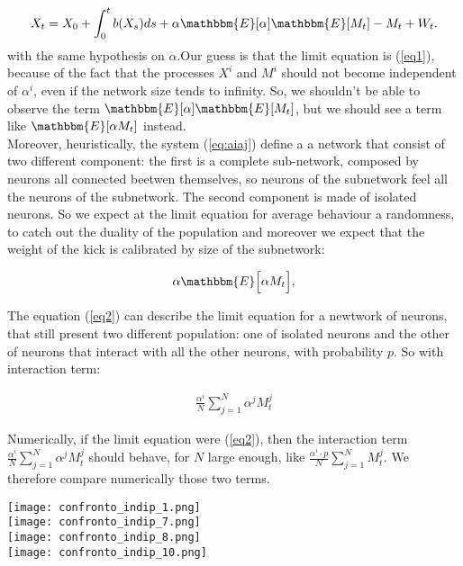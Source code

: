 \documentclass[11pt, a4paper]{article}
\begin{document}
\begin{equation} \label{eq2} X_t = X_0 + \int_0^t b(X_s) ds + \alpha \mathbbm{E}[\alpha] \mathbbm{E}[M_t] - M_t + W_t. 
\end{equation}
with the same hypothesis on $\alpha$.Our guess is that the limit equation is (\ref{eq1}), because of the fact that the processes $X^i$ and $M^i$ should not become independent of $\alpha^i$, even if the network size tends to infinity. So, we shouldn't be able to observe the term $\mathbbm{E}[\alpha]\mathbbm{E}[M_t]$, but we should see a term like $\mathbbm{E}[\alpha M_t]$ instead. \\

Moreover, heuristically, the system (\ref{eq:aiaj}) define a a network that consist of two different component: the first is a complete sub-network, composed by neurons all connected beetwen themselves, so neurons of the subnetwork feel all the neurons of the subnetwork. The second component is  made of isolated neurons. So we expect at the limit equation for average behaviour a randomness, to catch out the duality of the population and moreover we expect that the weight of the kick is calibrated by size of the subnetwork:

\[ \alpha \mathbbm{E} \Big[ \alpha M_t \Big], \]

The equation (\ref{eq2}) can describe the limit equation for a newtwork of neurons, that still present two different population: one of isolated neurons and the other of neurons that interact with all the other neurons, with probability $p$. So with interaction term:

\begin{eqnarray*}
\frac{\alpha^i}{N} \sum_{j = 1}^N \alpha^j M^j_t
\end{eqnarray*}

Numerically, if the limit equation were (\ref{eq2}), then the interaction term $\frac{\alpha^i}{N} \sum_{j = 1}^N \alpha^j M^j_t$ should behave, for $N$ large enough, like $\frac{\alpha^i \cdot p}{N} \sum_{j = 1}^N M^j_t$. We therefore compare numerically those two terms. 

\begin{center}
  \texttt{[image: confronto\_indip\_1.png]}\\
  \texttt{[image: confronto\_indip\_7.png]}\\
  \texttt{[image: confronto\_indip\_8.png]}\\
  \texttt{[image: confronto\_indip\_10.png]}\\
\end{center}
\end{document}
